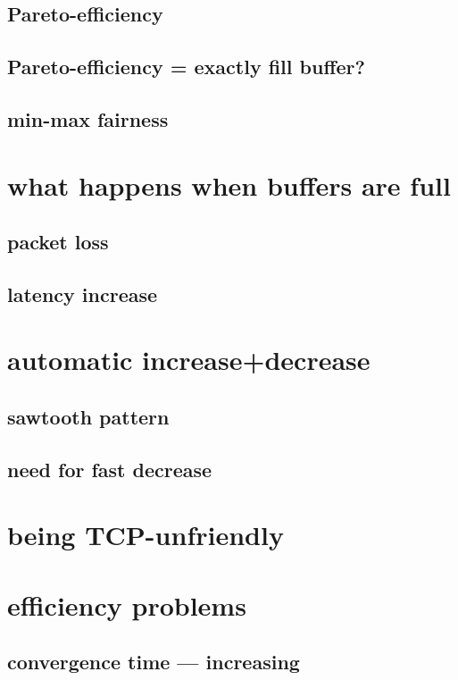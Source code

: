 \subsection{Pareto-efficiency}

\subsection{Pareto-efficiency = exactly fill buffer?}

\subsection{min-max fairness}

\section{what happens when buffers are full}

\subsection{packet loss}

\subsection{latency increase}

\section{automatic increase+decrease}

\subsection{sawtooth pattern}

\subsection{need for fast decrease}

\section{being TCP-unfriendly}

\section{efficiency problems}

\subsection{convergence time --- increasing}

